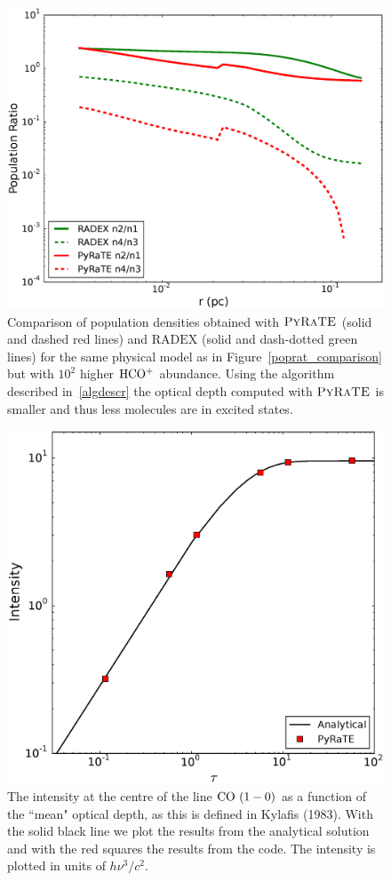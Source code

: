 \documentclass{mn2e}
\begin{document}
\begin{figure}
\includegraphics[width=1.0\columnwidth, clip]{poprat_comparison2.eps}
\caption{Comparison of population densities obtained with $\textsc{PyRaTE}$ (solid and dashed red lines) and $\text{RADEX}$ (solid and dash-dotted green lines) for the same physical model as in Figure~\ref{poprat_comparison} but with $10^2$ higher $\rm{HCO^+}$ abundance. Using the algorithm described in~\ref{algdescr} the optical depth computed with $\textsc{PyRaTE}$ is smaller and thus less molecules are in excited states.
\label{poprat_comparison2}}
\end{figure}

\begin{figure}
\includegraphics[width=1.0\columnwidth, clip]{comparison_analytical.eps}
\caption{The intensity at the centre of the line $\rm{CO} ~(1 - 0)$ as a function of the ``mean" optical depth, as this is defined in Kylafis (1983). With the solid black line we plot the results from the analytical solution and with the red squares the results from the code. The intensity is plotted in units of $h\nu^3/c^2$.
\label{analytical}}
\end{figure}
\end{document}
